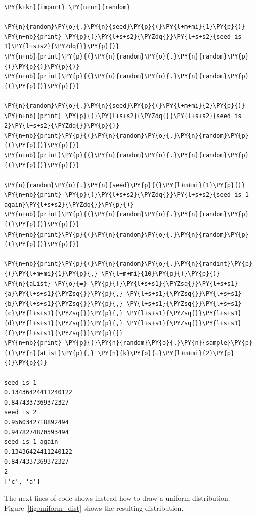 \begin{tcolorbox}[breakable, size=fbox, boxrule=1pt, pad at break*=1mm,colback=cellbackground, colframe=cellborder]
\begin{Verbatim}[commandchars=\\\{\}]
\PY{k+kn}{import} \PY{n+nn}{random} 

\PY{n}{random}\PY{o}{.}\PY{n}{seed}\PY{p}{(}\PY{l+m+mi}{1}\PY{p}{)}
\PY{n+nb}{print} \PY{p}{(}\PY{l+s+s2}{\PYZdq{}}\PY{l+s+s2}{seed is 1}\PY{l+s+s2}{\PYZdq{}}\PY{p}{)}
\PY{n+nb}{print}\PY{p}{(}\PY{n}{random}\PY{o}{.}\PY{n}{random}\PY{p}{(}\PY{p}{)}\PY{p}{)}
\PY{n+nb}{print}\PY{p}{(}\PY{n}{random}\PY{o}{.}\PY{n}{random}\PY{p}{(}\PY{p}{)}\PY{p}{)}

\PY{n}{random}\PY{o}{.}\PY{n}{seed}\PY{p}{(}\PY{l+m+mi}{2}\PY{p}{)}
\PY{n+nb}{print} \PY{p}{(}\PY{l+s+s2}{\PYZdq{}}\PY{l+s+s2}{seed is 2}\PY{l+s+s2}{\PYZdq{}}\PY{p}{)}
\PY{n+nb}{print}\PY{p}{(}\PY{n}{random}\PY{o}{.}\PY{n}{random}\PY{p}{(}\PY{p}{)}\PY{p}{)}
\PY{n+nb}{print}\PY{p}{(}\PY{n}{random}\PY{o}{.}\PY{n}{random}\PY{p}{(}\PY{p}{)}\PY{p}{)}

\PY{n}{random}\PY{o}{.}\PY{n}{seed}\PY{p}{(}\PY{l+m+mi}{1}\PY{p}{)}
\PY{n+nb}{print} \PY{p}{(}\PY{l+s+s2}{\PYZdq{}}\PY{l+s+s2}{seed is 1 again}\PY{l+s+s2}{\PYZdq{}}\PY{p}{)}
\PY{n+nb}{print}\PY{p}{(}\PY{n}{random}\PY{o}{.}\PY{n}{random}\PY{p}{(}\PY{p}{)}\PY{p}{)}
\PY{n+nb}{print}\PY{p}{(}\PY{n}{random}\PY{o}{.}\PY{n}{random}\PY{p}{(}\PY{p}{)}\PY{p}{)}

\PY{n+nb}{print}\PY{p}{(}\PY{n}{random}\PY{o}{.}\PY{n}{randint}\PY{p}{(}\PY{l+m+mi}{1}\PY{p}{,} \PY{l+m+mi}{10}\PY{p}{)}\PY{p}{)}
\PY{n}{aList} \PY{o}{=} \PY{p}{[}\PY{l+s+s1}{\PYZsq{}}\PY{l+s+s1}{a}\PY{l+s+s1}{\PYZsq{}}\PY{p}{,} \PY{l+s+s1}{\PYZsq{}}\PY{l+s+s1}{b}\PY{l+s+s1}{\PYZsq{}}\PY{p}{,} \PY{l+s+s1}{\PYZsq{}}\PY{l+s+s1}{c}\PY{l+s+s1}{\PYZsq{}}\PY{p}{,} \PY{l+s+s1}{\PYZsq{}}\PY{l+s+s1}{d}\PY{l+s+s1}{\PYZsq{}}\PY{p}{,} \PY{l+s+s1}{\PYZsq{}}\PY{l+s+s1}{f}\PY{l+s+s1}{\PYZsq{}}\PY{p}{]}
\PY{n+nb}{print} \PY{p}{(}\PY{n}{random}\PY{o}{.}\PY{n}{sample}\PY{p}{(}\PY{n}{aList}\PY{p}{,} \PY{n}{k}\PY{o}{=}\PY{l+m+mi}{2}\PY{p}{)}\PY{p}{)}

seed is 1
0.13436424411240122
0.8474337369372327
seed is 2
0.9560342718892494
0.9478274870593494
seed is 1 again
0.13436424411240122
0.8474337369372327
2
['c', 'a']
    \end{Verbatim}
\end{tcolorbox}

The next lines of code shows instead how to draw a uniform distribution. Figure~\ref{fig:uniform_dist} shows the resulting distribution.

